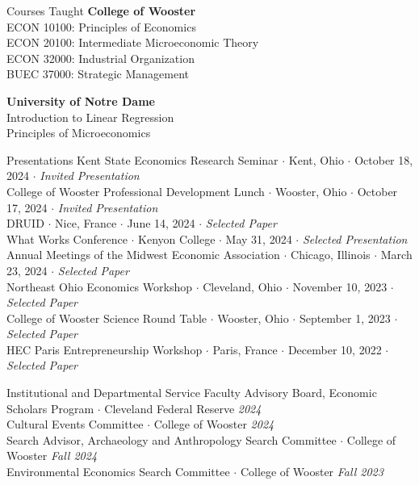 \documentclass{resume} %
\begin{document}

\begin{rSection}{Courses Taught}
	{\bf College of Wooster}  \\ 
	ECON 10100: Principles of Economics \\
	ECON 20100: Intermediate Microeconomic Theory \\
	ECON 32000: Industrial Organization \\
	BUEC 37000: Strategic Management

	{\bf University of Notre Dame}  \\ 
	Introduction to Linear Regression \\
    Principles of Microeconomics
\end{rSection}

\newpage
\begin{rSection}{Presentations}
Kent State Economics Research Seminar $\cdot$ Kent, Ohio $\cdot$ October 18, 2024 $\cdot$ \textit{Invited Presentation} \\
College of Wooster Professional Development Lunch $\cdot$ Wooster, Ohio $\cdot$ October 17, 2024 $\cdot$ \textit{Invited Presentation} \\
DRUID $\cdot$ Nice, France $\cdot$ June 14, 2024 $\cdot$ \textit{Selected Paper} \\
What Works Conference $\cdot$ Kenyon College $\cdot$ May 31, 2024 $\cdot$ \textit{Selected Presentation} \\
Annual Meetings of the Midwest Economic Association $\cdot$ Chicago, Illinois $\cdot$ March 23, 2024 $\cdot$ \textit{Selected Paper} \\
Northeast Ohio Economics Workshop $\cdot$ Cleveland, Ohio $\cdot$ November 10, 2023 $\cdot$ \textit{Selected Paper} \\
College of Wooster Science Round Table $\cdot$ Wooster, Ohio $\cdot$ September 1, 2023 $\cdot$ \textit{Selected Paper} \\
HEC Paris Entrepreneurship Workshop $\cdot$ Paris, France $\cdot$ December 10, 2022 $\cdot$ \textit{Selected Paper} 
\end{rSection}

\begin{rSection}{Institutional and Departmental Service}
	Faculty Advisory Board, Economic Scholars Program $\cdot$ Cleveland Federal Reserve \hfill {\em 2024} \\
	Cultural Events Committee $\cdot$ College of Wooster \hfill {\em 2024} \\
	Search Advisor, Archaeology and Anthropology Search Committee $\cdot$ College of Wooster \hfill {\em Fall 2024} \\
	Environmental Economics Search Committee $\cdot$ College of Wooster \hfill {\em Fall 2023}
\end{rSection}
\end{document}
